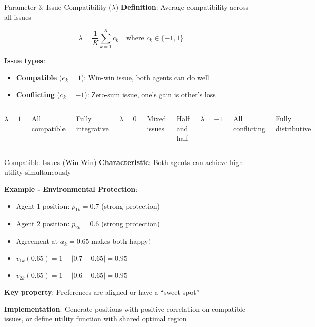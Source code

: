 \documentclass{beamer}
\begin{document}
\begin{frame}{Parameter 3: Issue Compatibility ($\lambda$)}
\textbf{Definition}: Average compatibility across all issues

\begin{equation*}
\lambda = \frac{1}{K} \sum_{k=1}^{K} c_k \quad \text{where } c_k \in \{-1, 1\}
\end{equation*}

\vspace{0.3cm}

\textbf{Issue types}:
\begin{itemize}
    \item \textbf{Compatible} ($c_k = 1$): Win-win issue, both agents can do well
    \item \textbf{Conflicting} ($c_k = -1$): Zero-sum issue, one's gain is other's loss
\end{itemize}

\vspace{0.5cm}

\begin{columns}
\centering
\textbf{$\lambda = 1$}

All compatible

Fully integrative

\centering
\textbf{$\lambda = 0$}

Mixed issues

Half and half

\centering
\textbf{$\lambda = -1$}

All conflicting

Fully distributive
\end{columns}
\end{frame}

\begin{frame}{Compatible Issues (Win-Win)}
\textbf{Characteristic}: Both agents can achieve high utility simultaneously

\vspace{0.3cm}

\textbf{Example - Environmental Protection}:
\begin{itemize}
    \item Agent 1 position: $p_{1k} = 0.7$ (strong protection)
    \item Agent 2 position: $p_{2k} = 0.6$ (strong protection)
    \item Agreement at $a_k = 0.65$ makes both happy!
    \item $v_{1k}(0.65) = 1 - |0.7 - 0.65| = 0.95$
    \item $v_{2k}(0.65) = 1 - |0.6 - 0.65| = 0.95$
\end{itemize}

\vspace{0.3cm}

\textbf{Key property}: Preferences are aligned or have a ``sweet spot''

\vspace{0.3cm}

\textbf{Implementation}: Generate positions with positive correlation on compatible issues, or define utility function with shared optimal region
\end{frame}
\end{document}
